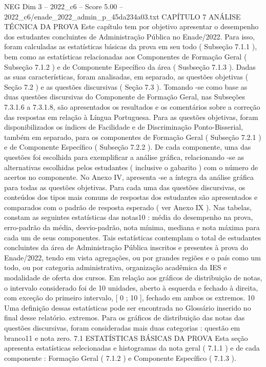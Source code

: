 \begin{textsample}{NEG Dim 3 – 2022\_c6 – Score 5.00 – 2022\_c6/enade\_2022\_admin\_p\_45da234a03.txt}  \label{ex:f3_neg_258}
CAPÍTULO 7 ANÁLISE TÉCNICA DA PROVA Este capítulo tem por objetivo apresentar o desempenho dos estudantes concluintes de Administração Pública no Enade/2022.
Para isso, foram calculadas as estatísticas básicas da prova em seu todo ( Subseção 7.1.1 ), bem como as estatísticas relacionadas aos Componentes de Formação Geral ( Subseção 7.1.2 ) e de Componente Específico da área ( Susbseção 7.1.3 ).
Dadas as suas características, foram analisadas, em separado, as questões objetivas ( Seção 7.2 ) e as questões discursivas ( Seção 7.3 ).
Tomando -se como base as duas questões discursivas do Componente de Formação Geral, nas Subseções 7.3.1.6 a 7.3.1.8, são apresentados os resultados e os comentários sobre a correção das respostas em relação à Língua Portuguesa.
Para as questões objetivas, foram disponibilizados os índices de Facilidade e de Discriminação Ponto-Bisserial, também em separado, para os componentes de Formação Geral ( Subseção 7.2.1 ) e de Componente Específico ( Subseção 7.2.2 ).
De cada componente, uma das questões foi escolhida para exemplificar a análise gráfica, relacionando -se as alternativas escolhidas pelos estudantes ( inclusive o gabarito ) com o número de acertos no componente.
No Anexo IV, apresenta -se a íntegra da análise gráfica para todas as questões objetivas.
Para cada uma das questões discursivas, os conteúdos dos tipos mais comuns de respostas dos estudantes são apresentados e comparados com o padrão de resposta esperado ( ver Anexo IX ).
Nas tabelas, constam as seguintes estatísticas das notas10 : média do desempenho na prova, erro-padrão da média, desvio-padrão, nota mínima, mediana e nota máxima para cada um de seus componentes.
Tais estatísticas contemplam o total de estudantes concluintes da área de Administração Pública inscritos e presentes à prova do Enade/2022, tendo em vista agregações, ou por grandes regiões e o país como um todo, ou por categoria administrativa, organização acadêmica da IES e modalidade de oferta dos cursos.
Em relação aos gráficos de distribuição de notas, o intervalo considerado foi de 10 unidades, aberto à esquerda e fechado à direita, com exceção do primeiro intervalo, [ 0 ; 10 ], fechado em ambos os extremos. 10 Uma definição dessas estatísticas pode ser encontrada no Glossário inserido no final desse relatório. extremos.
Para os gráficos de distribuição das notas das questões discursivas, foram consideradas mais duas categorias : questão em branco11 e nota zero. 7.1 ESTATÍSTICAS BÁSICAS DA PROVA Esta seção apresenta estatísticas selecionadas e histogramas da nota geral ( 7.1.1 ) e de cada componente : Formação Geral ( 7.1.2 ) e Componente Específico ( 7.1.3 ).

\end{textsample}
